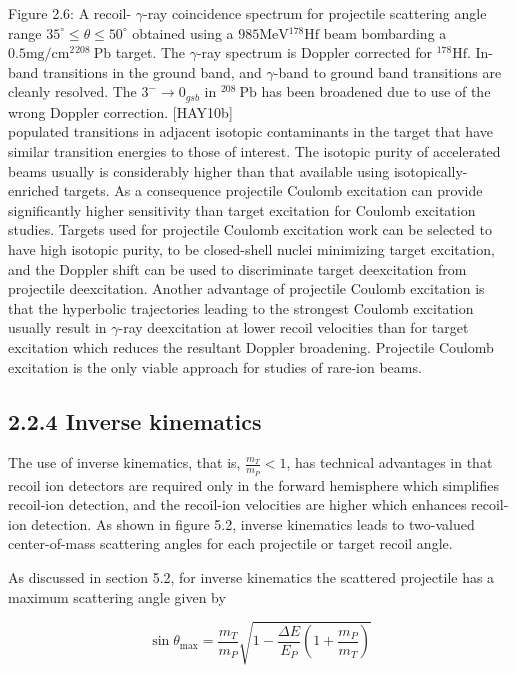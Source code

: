 \documentclass[10pt]{article}
\begin{document}
Figure 2.6: A recoil- $\gamma$-ray coincidence spectrum for projectile scattering angle range $35^{\circ} \leq \theta \leq 50^{\circ}$ obtained using a $985 \mathrm{MeV}{ }^{178} \mathrm{Hf}$ beam bombarding a $0.5 \mathrm{mg} / \mathrm{cm}^{2}{ }^{208} \mathrm{~Pb}$ target. The $\gamma$-ray spectrum is Doppler corrected for ${ }^{178} \mathrm{Hf}$. In-band transitions in the ground band, and $\gamma$-band to ground band transitions are cleanly resolved. The $3^{-} \rightarrow 0_{g s b}$ in ${ }^{208} \mathrm{~Pb}$ has been broadened due to use of the wrong Doppler correction. [HAY10b]\\
populated transitions in adjacent isotopic contaminants in the target that have similar transition energies to those of interest. The isotopic purity of accelerated beams usually is considerably higher than that available using isotopically-enriched targets. As a consequence projectile Coulomb excitation can provide significantly higher sensitivity than target excitation for Coulomb excitation studies. Targets used for projectile Coulomb excitation work can be selected to have high isotopic purity, to be closed-shell nuclei minimizing target excitation, and the Doppler shift can be used to discriminate target deexcitation from projectile deexcitation. Another advantage of projectile Coulomb excitation is that the hyperbolic trajectories leading to the strongest Coulomb excitation usually result in $\gamma$-ray deexcitation at lower recoil velocities than for target excitation which reduces the resultant Doppler broadening. Projectile Coulomb excitation is the only viable approach for studies of rare-ion beams.

\subsection*{2.2.4 Inverse kinematics}
The use of inverse kinematics, that is, $\frac{m_{T}}{m_{P}}<1$, has technical advantages in that recoil ion detectors are required only in the forward hemisphere which simplifies recoil-ion detection, and the recoil-ion velocities are higher which enhances recoil-ion detection. As shown in figure 5.2, inverse kinematics leads to two-valued center-of-mass scattering angles for each projectile or target recoil angle.

As discussed in section 5.2, for inverse kinematics the scattered projectile has a maximum scattering angle given by

$$
\sin \theta_{\max }=\frac{m_{T}}{m_{P}} \sqrt{1-\frac{\Delta E}{E_{P}}\left(1+\frac{m_{P}}{m_{T}}\right)}
$$
\end{document}
